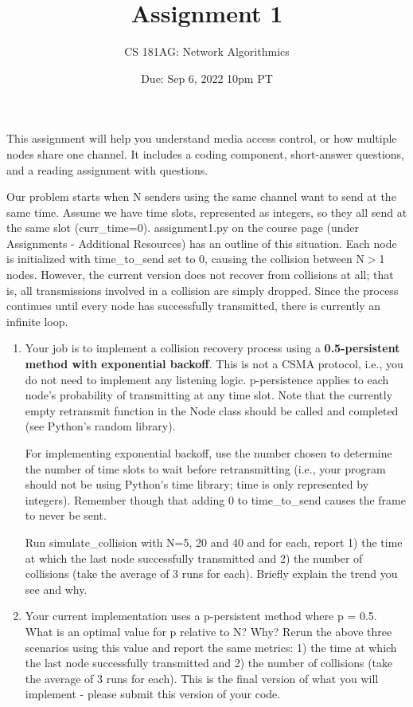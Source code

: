 \documentclass[10pt]{article}
\date{Due: Sep 6, 2022 10pm PT}
\newenvironment{problem}[2][Problem]{\begin{trivlist}
\item[\hskip \labelsep {\bfseries #1}\hskip \labelsep {\bfseries #2.}]}{\end{trivlist}}
\begin{document}
 
\title{Assignment 1}
\author{
CS 181AG: Network Algorithmics}
\maketitle

This assignment will help you understand media access control, or how multiple nodes share one channel. It includes a coding component, short-answer questions, and a reading assignment with questions.  

 
\begin{problem}{1: Responding to Collisions}
Our problem starts when N senders using the same channel want to send at the same time. Assume we have time slots, represented as integers, so they all send at the same slot (curr\_time=0). assignment1.py on the course page (under Assignments - Additional Resources) has an outline of this situation. Each node is initialized with time\_to\_send set to 0, causing the collision between N$>$1 nodes. However, the current version does not recover from collisions at all; that is, all transmissions involved in a collision are simply dropped. Since the process continues until every node has successfully transmitted, there is currently an infinite loop.
\begin{enumerate}[label=(\alph*)]
\item Your job is to implement a collision recovery process using a \textbf{0.5-persistent method with exponential backoff}. This is not a CSMA protocol, i.e., you do not need to implement any listening logic. p-persistence applies to each node's probability of transmitting at any time slot. Note that the currently empty retransmit function in the Node class should be called and completed (see Python's random library). 

For implementing exponential backoff, use the number chosen to determine the number of time slots to wait before retransmitting (i.e., your program should not be using Python's time library; time is only represented by integers). Remember though that adding 0 to time\_to\_send causes the frame to never be sent. 

Run simulate\_collision with N=5, 20 and 40 and for each, report 1) the time at which the last node successfully transmitted and 2) the number of collisions (take the average of 3 runs for each). Briefly explain the trend you see and why. 

\item Your current implementation uses a p-persistent method where p = 0.5. What is an optimal value for p relative to N? Why? Rerun the above three scenarios using this value and report the same metrics: 1) the time at which the last node successfully transmitted and 2) the number of collisions (take the average of 3 runs for each). This is the final version of what you will implement - please submit this version of your code.


\end{enumerate}
\end{problem}
\end{document}
